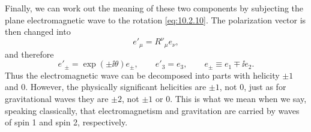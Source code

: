 Finally, we can work out the meaning of these two components by subjecting
the plane electromagnetic wave to the rotation \eqref{eq:10.2.10}. The
polarization vector is then changed into
\[
  e'_\mu=R^\nu{}_\mu e_\nu,
\]
and therefore
\[
  e'_\pm=\exp(\pm\ii\theta)e_\pm,
  \qquad
  e'_3=e_3,
  \qquad
  e_\pm\equiv e_1\mp\ii e_2.
\]
Thus the electromagnetic wave can be decomposed into parts with helicity
\(\pm1\) and \(0\). However, the physically significant helicities are
\(\pm1\), not \(0\), just as for gravitational waves they are \(\pm2\), not
\(\pm1\) or \(0\). This is what we mean when we say, speaking classically,
that electromagnetism and gravitation are carried by waves of spin 1 and spin
2, respectively.
